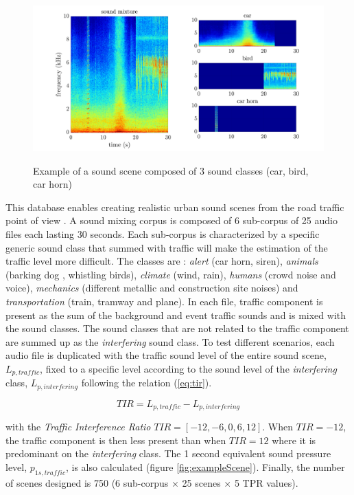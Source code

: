 \documentclass[twocolumn,a4paper,10pt]{article}
\begin{document}
\begin{figure}[h]
\centering
\includegraphics[width=\linewidth]{../image/exampleSimScene2.pdf}
\label{fig:exampleSimScene}
\caption{Example of a sound scene composed of 3 sound classes (car, bird, car horn)}
\end{figure}

This database enables creating realistic urban sound scenes from the road traffic point of view \cite{gloaguen_creation_2017}. A sound mixing corpus is composed of 6 sub-corpus of 25 audio files each lasting 30 seconds. Each sub-corpus is characterized by a specific generic sound class that summed with traffic will make the estimation of the traffic level more difficult. The classes are : \textit{alert} (car horn, siren), \textit{animals} (barking dog , whistling birds), \textit{climate} (wind, rain), \textit{humans} (crowd noise and voice), \textit{mechanics} (different metallic and construction site noises) and \textit{transportation} (train, tramway and plane). In each file, traffic component is present as the sum of the background and event traffic sounds and is mixed with the sound classes. The sound classes that are not related to the traffic component are summed up as the \textit{interfering} sound class. To test different scenarios, each audio file is duplicated with the traffic sound level of the entire sound scene, $L_{p,traffic}$, fixed to a specific level according to the sound level of the \textit{interfering} class, $L_{p,interfering}$ following the relation (\ref{eq:tir}).

\begin{equation}\label{eq:tir}
TIR = L_{p,traffic}-L_{p,interfering}
\end{equation}

with the \textit{Traffic Interference Ratio} $TIR = \left[-12, -6, 0, 6, 12\right]$. When $TIR = -12$, the traffic component is then less present than when $TIR = 12$ where it is predominant on the \textit{interfering} class. The 1 second equivalent sound pressure level, $p_{1s,traffic}$, is also calculated (figure \ref{fig:exampleScene}). Finally, the number of scenes designed is 750 (6 sub-corpus $\times$ 25 scenes $\times$  5 TPR values).
\end{document}
